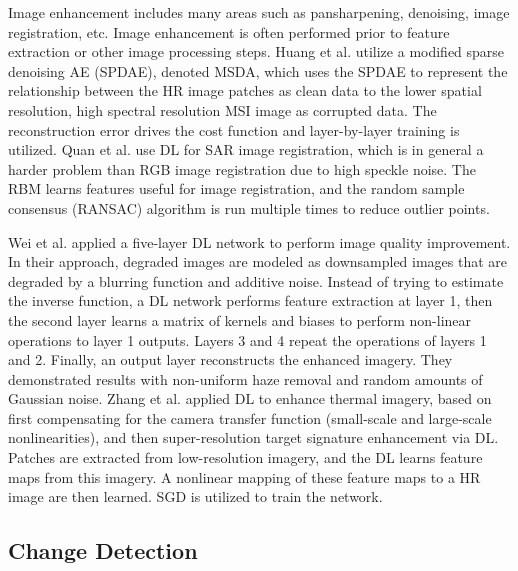 \documentclass[12pt]{spieman}
\begin{document}
\begin{spacing}{1}
Image enhancement includes many areas such as pansharpening, denoising, image registration, etc. Image enhancement is often performed prior to feature extraction or other image processing steps. Huang et al. \cite{huang2015new} utilize a modified sparse denoising AE (SPDAE), denoted MSDA, which uses the SPDAE to represent the relationship between the HR image patches as clean data to the lower spatial resolution, high spectral resolution MSI image as corrupted data. The reconstruction error drives the cost function and layer-by-layer training is utilized. Quan et al. \cite{Quan2016Using} use DL for SAR image registration, which is in general a harder problem than RGB image registration due to high speckle noise. The RBM learns features useful for image registration, and the random sample consensus (RANSAC) algorithm is run multiple times to reduce outlier points.

Wei et al. \cite{Wei2016Universal} applied a five-layer DL network to perform image quality improvement. In their approach, degraded images are modeled as downsampled images that are degraded by a blurring function and additive noise. Instead of trying to estimate the inverse function, a DL network performs feature extraction at layer 1, then the second layer learns a matrix of kernels and biases to perform non-linear operations to layer 1 outputs. Layers 3 and 4 repeat the operations of layers 1 and 2. Finally, an output layer reconstructs the enhanced imagery. They demonstrated results with non-uniform haze removal and random amounts of Gaussian noise. Zhang et al. \cite{zhang2016systematic} applied DL to enhance thermal imagery, based on first compensating for the camera transfer function (small-scale and large-scale nonlinearities), and then super-resolution target signature enhancement via DL. Patches are extracted from low-resolution imagery, and the DL learns feature maps from this imagery. A nonlinear mapping of these feature maps to a HR image are then learned. SGD is utilized to train the network.

\subsection{Change Detection}


\end{spacing}
\end{document}
